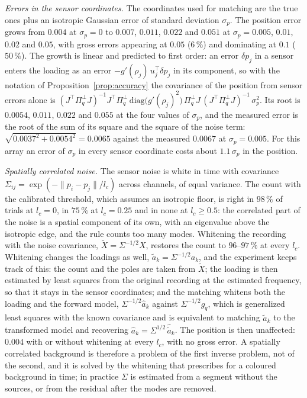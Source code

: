\documentclass{article}
\begin{document}
\emph{Errors in the sensor coordinates.} The coordinates used for matching are the true ones plus an isotropic Gaussian error of standard deviation $\sigma_p$. The position error grows from $0.004$ at $\sigma_p = 0$ to $0.007$, $0.011$, $0.022$ and $0.051$ at $\sigma_p = 0.005$, $0.01$, $0.02$ and $0.05$, with gross errors appearing at $0.05$ ($6\,\%$) and dominating at $0.1$ ($50\,\%$). The growth is linear and predicted to first order: an error $\delta p_j$ in a sensor enters the loading as an error $-g'(\rho_j)\, u_j^{\top} \delta p_j$ in its component, so with the notation of Proposition~\ref{prop:accuracy} the covariance of the position from sensor errors alone is $(J^{\top} \Pi_q^{\perp} J)^{-1} J^{\top} \Pi_q^{\perp}\, \mathrm{diag}\bigl(g'(\rho_j)^{2}\bigr)\, \Pi_q^{\perp} J\, (J^{\top} \Pi_q^{\perp} J)^{-1}\, \sigma_p^{2}$. Its root is $0.0054$, $0.011$, $0.022$ and $0.055$ at the four values of $\sigma_p$, and the measured error is the root of the sum of its square and the square of the noise term: $\sqrt{0.0037^{2} + 0.0054^{2}} = 0.0065$ against the measured $0.0067$ at $\sigma_p = 0.005$. For this array an error of $\sigma_p$ in every sensor coordinate costs about $1.1\,\sigma_p$ in the position.

\emph{Spatially correlated noise.} The sensor noise is white in time with covariance $\Sigma_{ij} = \exp(-\lVert p_i - p_j \rVert / l_c)$ across channels, of equal variance. The count with the calibrated threshold, which assumes an isotropic floor, is right in $98\,\%$ of trials at $l_c = 0$, in $75\,\%$ at $l_c = 0.25$ and in none at $l_c \ge 0.5$: the correlated part of the noise is a spatial component of its own, with an eigenvalue above the isotropic edge, and the rule counts too many modes. Whitening the recording with the noise covariance, $\widetilde{X} = \Sigma^{-1/2} X$, restores the count to $96$--$97\,\%$ at every $l_c$. Whitening changes the loadings as well, $\widetilde{a}_k = \Sigma^{-1/2} a_k$, and the experiment keeps track of this: the count and the poles are taken from $\widetilde{X}$; the loading is then estimated by least squares from the original recording at the estimated frequency, so that it stays in the sensor coordinates; and the matching whitens both the loading and the forward model, $\Sigma^{-1/2}\widehat{a}_k$ against $\Sigma^{-1/2} g_q$, which is generalized least squares with the known covariance and is equivalent to matching $\widehat{\widetilde{a}}_k$ to the transformed model and recovering $\widehat{a}_k = \Sigma^{1/2}\,\widehat{\widetilde{a}}_k$. The position is then unaffected: $0.004$ with or without whitening at every $l_c$, with no gross error. A spatially correlated background is therefore a problem of the first inverse problem, not of the second, and it is solved by the whitening that \cite{ref-companionA} prescribes for a coloured background in time; in practice $\Sigma$ is estimated from a segment without the sources, or from the residual after the modes are removed.
\end{document}
